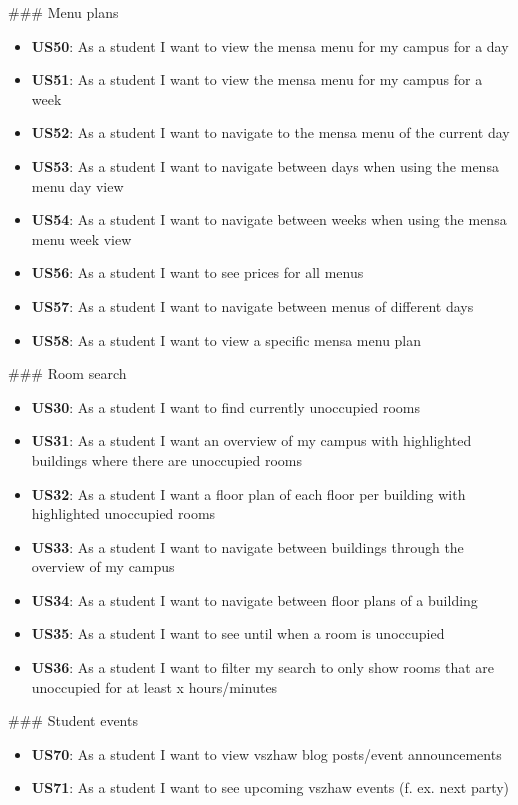 \begin{markdown}
\newpage

### Menu plans

\begin{itemize}
  \item \textbf{US50}: As a student I want to view the mensa menu for my campus for a day
  \item \textbf{US51}: As a student I want to view the mensa menu for my campus for a week
  \item \textbf{US52}: As a student I want to navigate to the mensa menu of the current day
  \item \textbf{US53}: As a student I want to navigate between days when using the mensa menu day view
  \item \textbf{US54}: As a student I want to navigate between weeks when using the mensa menu week view
  \item \textbf{US56}: As a student I want to see prices for all menus
  \item \textbf{US57}: As a student I want to navigate between menus of different days
  \item \textbf{US58}: As a student I want to view a specific mensa menu plan
\end{itemize}

### Room search

\begin{itemize}
  \item \textbf{US30}: As a student I want to find currently unoccupied rooms
  \item \textbf{US31}: As a student I want an overview of my campus with highlighted buildings where there are unoccupied rooms
  \item \textbf{US32}: As a student I want a floor plan of each floor per building with highlighted unoccupied rooms
  \item \textbf{US33}: As a student I want to navigate between buildings through the overview of my campus
  \item \textbf{US34}: As a student I want to navigate between floor plans of a building
  \item \textbf{US35}: As a student I want to see until when a room is unoccupied
  \item \textbf{US36}: As a student I want to filter my search to only show rooms that are unoccupied for at least x hours/minutes
\end{itemize}

### Student events

\begin{itemize}
  \item \textbf{US70}: As a student I want to view vszhaw blog posts/event announcements
  \item \textbf{US71}: As a student I want to see upcoming vszhaw events (f. ex. next party)
\end{itemize}

\end{markdown}

